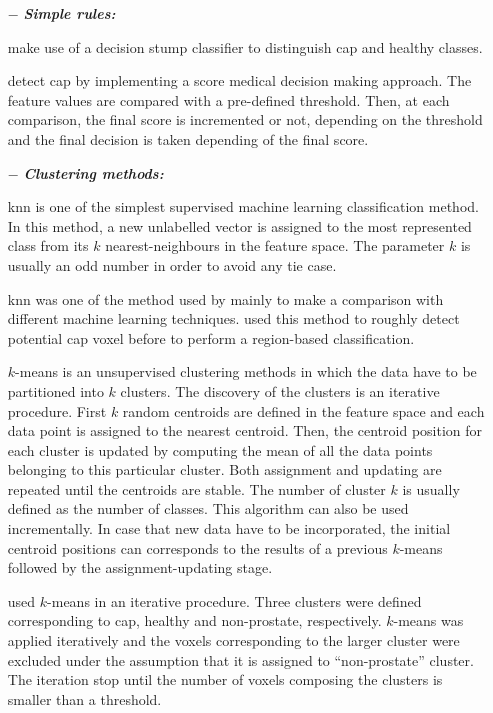 \begin{enumerate}[leftmargin=*]

\item[$-$] \textbf{\textit{Simple rules:}}

\cite{Lv2009} make use of a decision stump classifier to distinguish \ac{cap} and healthy classes. 

\cite{Puech2009} detect \ac{cap} by implementing a score medical decision making approach. The feature values are compared with a pre-defined threshold. Then, at each comparison, the final score is incremented or not, depending on the threshold and the final decision is taken depending of the final score.

\item[$-$] \textbf{\textit{Clustering methods:}} 

\acf{knn} is one of the simplest supervised machine learning classification method. In this method, a new unlabelled vector is assigned to the most represented class from its $k$ nearest-neighbours in the feature space. The parameter $k$ is usually an odd number in order to avoid any tie case. 

\ac{knn} was one of the method used by \cite{Niaf2011,Niaf2012} mainly to make a comparison with different machine learning techniques. \cite{Litjens2012} used this method to roughly detect potential \ac{cap} voxel before to perform a region-based classification.

$k$-means is an unsupervised clustering methods in which the data have to be partitioned into $k$ clusters. The discovery of the clusters is an iterative procedure. First $k$ random centroids are defined in the feature space and each data point is assigned to the nearest centroid. Then, the centroid position for each cluster is updated by computing the mean of all the data points belonging to this particular cluster. Both assignment and updating are repeated until the centroids are stable. The number of cluster $k$ is usually defined as the number of classes. This algorithm can also be used incrementally. In case that new data have to be incorporated, the initial centroid positions can corresponds to the results of a previous $k$-means followed by the assignment-updating stage.

\cite{Tiwari2007,Tiwari2009} used $k$-means in an iterative procedure. Three clusters were defined corresponding to \ac{cap}, healthy and non-prostate, respectively. $k$-means was applied iteratively and the voxels corresponding to the larger cluster were excluded under the assumption that it is assigned to ``non-prostate'' cluster. The iteration stop until the number of voxels composing the clusters is smaller than a threshold.


\end{enumerate}
